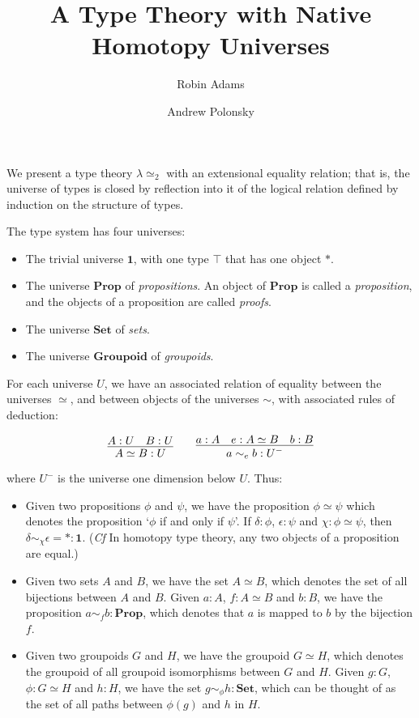 \documentclass{easychair}
\title{A Type Theory with Native Homotopy Universes}
\author{Robin Adams\inst{1} \and Andrew Polonsky\inst{2}}
\institute{Universitetet i Bergen \and University Paris Diderot}
\newcommand{\Prop}{\ensuremath{\mathbf{Prop}}}
\newcommand{\Set}{\ensuremath{\mathbf{Set}}}
\newcommand{\Groupoid}{\ensuremath{\mathbf{Groupoid}}}
\newcommand{\LEtwo}{\ensuremath{\lambda \simeq_2}}
\begin{document}
\maketitle

We present a type theory $\LEtwo$ with an extensional equality relation; that is, the universe of types is closed by reflection into it of the logical relation defined by induction on the structure of types.

The type system has four universes:
\begin{itemize}
\item
The trivial universe $\mathbf{1}$, with one type $\top$ that has one object $*$.
\item
The universe $\Prop$ of \emph{propositions}.  An object of $\Prop$ is called a \emph{proposition}, and the objects of a proposition are called \emph{proofs}.
\item
The universe $\Set$ of \emph{sets}.
\item
The universe $\Groupoid$ of \emph{groupoids}.
\end{itemize}

For each universe $U$, we have an associated relation of equality between the universes $\simeq$, and between objects of the universes $\sim$, with associated rules of deduction:

\[ \infer{A \simeq B : U}{A : U \quad B : U}
\qquad
\infer{a \sim_e b : U^-}{a : A \quad e : A \simeq B \quad b : B} \]

where $U^-$ is the universe one dimension below $U$.  Thus:
\begin{itemize}
\item
Given two propositions $\phi$ and $\psi$, we have the proposition $\phi \simeq \psi$ which denotes the proposition `$\phi$ if and only if $\psi$'.  If $\delta : \phi$, $\epsilon : \psi$ and $\chi : \phi \simeq \psi$, then $\delta \sim_\chi \epsilon = * : \mathbf{1}$.  (\emph{Cf} In homotopy type theory, any two objects of a proposition are equal.)
\item
Given two sets $A$ and $B$, we have the set $A \simeq B$, which denotes the set of all bijections between $A$ and $B$.  Given $a : A$, $f : A \simeq B$ and $b : B$, we have the proposition $a \sim_f b : \Prop$, which denotes that $a$ is mapped to $b$ by the bijection $f$.
\item
Given two groupoids $G$ and $H$, we have the groupoid $G \simeq H$, which denotes the groupoid of all groupoid isomorphisms between $G$ and $H$.  Given $g : G$, $\phi : G \simeq H$ and $h : H$, we have the set $g \sim_\phi h : \Set$, which can be thought of as the set of all paths between $\phi(g)$ and $h$ in $H$.
\end{itemize}
\end{document}

